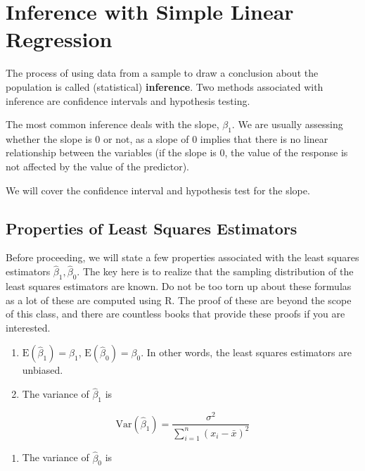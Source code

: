 \documentclass[
]{book}
\providecommand{\tightlist}{%
  \setlength{\itemsep}{0pt}\setlength{\parskip}{0pt}}
\begin{document}
\hypertarget{SLRinf}{%
\section{Inference with Simple Linear Regression}\label{SLRinf}}

The process of using data from a sample to draw a conclusion about the population is called (statistical) \textbf{inference}. Two methods associated with inference are confidence intervals and hypothesis testing.

The most common inference deals with the slope, \(\beta_1\). We are usually assessing whether the slope is 0 or not, as a slope of 0 implies that there is no linear relationship between the variables (if the slope is 0, the value of the response is not affected by the value of the predictor).

We will cover the confidence interval and hypothesis test for the slope.

\hypertarget{properties-of-least-squares-estimators}{%
\subsection{Properties of Least Squares Estimators}\label{properties-of-least-squares-estimators}}

Before proceeding, we will state a few properties associated with the least squares estimators \(\hat{\beta}_1, \hat{\beta}_0\). The key here is to realize that the sampling distribution of the least squares estimators are known. Do not be too torn up about these formulas as a lot of these are computed using R. The proof of these are beyond the scope of this class, and there are countless books that provide these proofs if you are interested.

\begin{enumerate}
\def\labelenumi{\arabic{enumi}.}
\item
  \(\mbox{E}(\hat{\beta}_1) = \beta_1\), \(\mbox{E}(\hat{\beta}_0) = \beta_0\). In other words, the least squares estimators are unbiased.
\item
  The variance of \(\hat{\beta}_1\) is
\end{enumerate}

\begin{equation} 
\mbox{Var}(\hat{\beta}_1) = \frac{\sigma^{2}}{\sum_{i=1}^n{(x_{i}-\bar{x})^{2}}}
\label{eq:10-varb1}
\end{equation}

\begin{enumerate}
\def\labelenumi{\arabic{enumi}.}
\setcounter{enumi}{2}
\tightlist
\item
  The variance of \(\hat{\beta}_0\) is
\end{enumerate}
\end{document}
